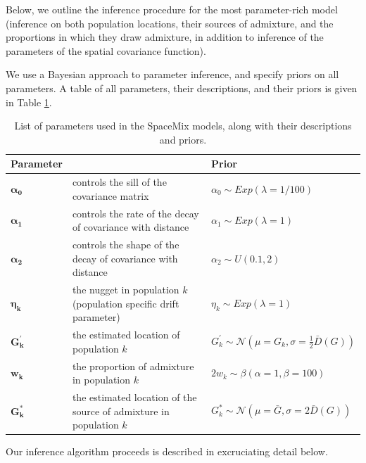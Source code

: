 \documentclass[12pt]{article}
\newcommand{\identifyadmixsource}[1]{{#1^{*}}}
\begin{document}
Below, we outline the inference procedure for the most parameter-rich model (inference on both population locations, their sources of admixture, and the proportions in which they draw admixture, in addition to inference of the parameters of the spatial covariance function).

We use a Bayesian approach to parameter inference, and specify priors on all parameters.  A table of all parameters, their descriptions, and their priors is given in Table \ref{tab:param_prior_tab}.

\begin{centering}
\begin{table}
\begin{tabular}{| >{\centering\arraybackslash}m{2.1cm} | m{6cm} | >{\centering\arraybackslash}m{6cm} |}
	\hline
	\textbf{Parameter} & \centering{\textbf{Description}} & \textbf{Prior}\\ \hline
	$\boldsymbol{\alpha_0}$ & 
		controls the sill of the covariance matrix & 
		$\alpha_0 \sim Exp(\lambda = 1/100)$\\ \hline
	$\boldsymbol{\alpha_1}$ & 
		controls the rate of the decay of covariance with distance & 
		$\alpha_1 \sim Exp(\lambda = 1)$\\ \hline
	$\boldsymbol{\alpha_2}$ & 
		controls the shape of the decay of covariance with distance & 
		$\alpha_2 \sim U(0.1,2)$\\ \hline
	$\boldsymbol{\eta_k}$ & 
		the nugget in population $k$ (population specific drift parameter)  & 
		$\eta_k \sim Exp(\lambda = 1)$\\ \hline
	$\boldsymbol{G_k^{\prime}}$ & 
		the estimated location of population $k$ &
		 $G_k^{\prime} \sim \mathcal{N}(\mu = G_k,\sigma = \frac{1}{2}\bar{D}(G))$ \\ \hline
	$\boldsymbol{w_k}$ &
		the proportion of admixture in population $k$ &
		$2 w_k \sim \beta(\alpha = 1,\beta = 100)$  \\ \hline
	$\boldsymbol{\identifyadmixsource{G_k}}$ &
		the estimated location of the source of admixture in population $k$ &
		$\identifyadmixsource{G_k} \sim \mathcal{N}(\mu = \bar{G},\sigma = 2 \bar{D}(G))$ \\
	\hline
\end{tabular}
\caption{List of parameters used in the SpaceMix models, along with their descriptions and priors.}\label{tab:param_prior_tab}
\end{table}
\end{centering}

Our inference algorithm proceeds is described in excruciating detail below.
\end{document}
